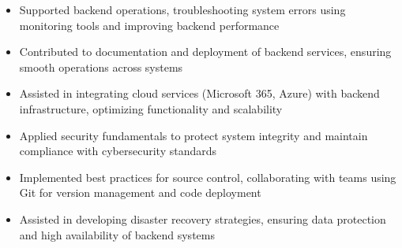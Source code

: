 \par\smallskip
\noindent
\begin{minipage}{20cm}
  \begin{minipage}{9.75cm}
    \begin{itemize}
      \item Supported backend operations, troubleshooting system errors using monitoring tools and improving backend performance
      \item Contributed to documentation and deployment of backend services, ensuring smooth operations across systems
      \item Assisted in integrating cloud services (Microsoft 365, Azure) with backend infrastructure, optimizing functionality and scalability
    \end{itemize}
  \end{minipage}
  \hfill
  \begin{minipage}{9.75cm}
    \begin{itemize}
      \item Applied security fundamentals to protect system integrity and maintain compliance with cybersecurity standards
      \item Implemented best practices for source control, collaborating with teams using Git for version management and code deployment
      \item Assisted in developing disaster recovery strategies, ensuring data protection and high availability of backend systems
    \end{itemize}
  \end{minipage}
\end{minipage}
\par\smallskip
\divider

